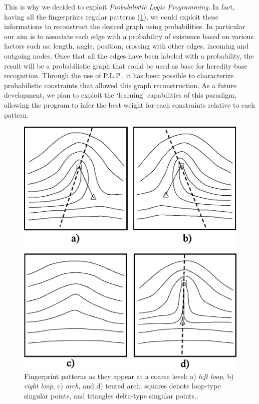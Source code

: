 \documentclass[8pt]{article}
\begin{document}
    This is why we decided to exploit \textit{Probabilistic Logic Programming}.
   	In fact, having all the fingerprints regular patterns
    (\cref{fig:patterns}), we could exploit these informations to reconstruct 
    the desired graph using probabilities.
   	In particular our aim is to associate each edge with a probability of existence 
    based on various factors such as: length, angle, position, crossing with other edges, 
    incoming and outgoing nodes.
   	Once that all the edges have been labeled with a probability, the result will be a 
    probabilistic graph that could be used as base for heredity-base recognition.
   	Through the use of P.L.P., it has been possible to characterize probabilistic 
    constraints that allowed this graph reconstruction.
   	As a future development, we plan to exploit the \textquoteleft learning' capabilities of 
    this paradigm, allowing the program to infer the best weight for each constraints 
    relative to each pattern.

    \begin{figure}
		\centering
		\includegraphics[width=0.6\linewidth]{img/patterns}
		\caption{Fingerprint patterns as they appear at a coarse level: a) \textit{left loop}, b) \textit{right loop}, c) \textit{\textit{arch}}, and d) tented arch; squares denote loop-type singular points, and triangles
			delta-type singular points..}
		\label{fig:patterns}
	\end{figure}%





\end{document}
